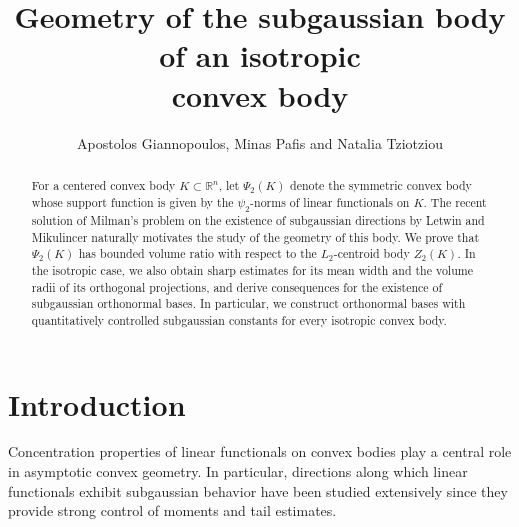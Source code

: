 \documentclass[11pt,leqno]{article}
\theoremstyle{definition}
\numberwithin{equation}{section}
\begin{document}
\small

\title{\bf Geometry of the subgaussian body of an isotropic\\ convex body}

\author{Apostolos Giannopoulos, Minas Pafis and Natalia Tziotziou}

\date{}
\maketitle

\begin{abstract}\footnotesize 
For a centered convex body $K\subset\mathbb{R}^n$, let $\Psi_2(K)$ denote the symmetric convex body whose support function is given by the $\psi_2$-norms of 
linear functionals on $K$. The recent solution of Milman's problem on the existence of subgaussian directions by Letwin and Mikulincer 
naturally motivates the study of the geometry of this body.
We prove that $\Psi_2(K)$ has bounded volume ratio with respect to the $L_2$-centroid body $Z_2(K)$.
In the isotropic case, we also obtain sharp estimates for its mean width and the volume radii of its orthogonal projections, 
and derive consequences for the existence of subgaussian orthonormal bases. In particular, we construct orthonormal bases with quantitatively 
controlled subgaussian constants for every isotropic convex body.
\end{abstract}




\section{Introduction}\label{section:1}

Concentration properties of linear functionals on convex bodies play a central role in asymptotic convex geometry. In particular, directions along which linear functionals exhibit subgaussian behavior have been studied extensively since they provide strong control of moments and tail estimates. 
\end{document}
